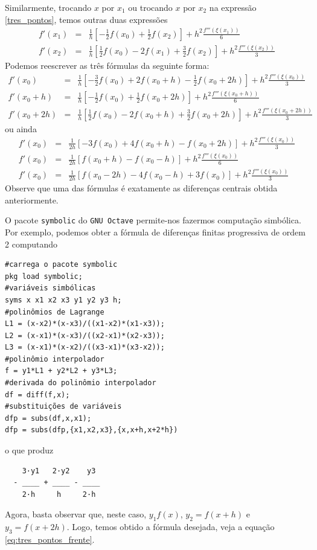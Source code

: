 Similarmente, trocando $x$ por $x_1$ ou trocando $x$ por $x_2$ na expressão \eqref{tres_pontos}, temos outras duas expressões
\begin{eqnarray*}
f'(x_1)&=&\frac{1}{h}\left[-\frac{1}{2}f(x_0)
+\frac{1}{2}f(x_{2})\right]+h^2\frac{f'''(\xi(x_1))}{6}\\
f'(x_2)&=&\frac{1}{h}\left[\frac{1}{2}f(x_0)-2f(x_{1})
+\frac{3}{2}f(x_{2})\right]+h^2\frac{f'''(\xi(x_2))}{3}
\end{eqnarray*}
Podemos reescrever as três fórmulas da seguinte forma:
\begin{eqnarray*}
f'(x_0)&=&\frac{1}{h}\left[-\frac{3}{2}f(x_0)+2f(x_{0}+h)
-\frac{1}{2}f(x_{0}+2h)\right]+h^2\frac{f'''(\xi(x_0))}{3}\\
f'(x_0+h)&=&\frac{1}{h}\left[-\frac{1}{2}f(x_0)
+\frac{1}{2}f(x_{0}+2h)\right]+h^2\frac{f'''(\xi(x_0+h))}{6}\\
f'(x_0+2h)&=&\frac{1}{h}\left[\frac{1}{2}f(x_0)-2f(x_{0}+h)
+\frac{3}{2}f(x_{0}+2h)\right]+h^2\frac{f'''(\xi(x_{0}+2h))}{3}
\end{eqnarray*}
ou ainda
\begin{eqnarray}
f'(x_0)&=&\frac{1}{2h}\left[-3f(x_0)+4f(x_{0}+h)
-f(x_{0}+2h)\right]+h^2\frac{f'''(\xi(x_0))}{3}\label{eq:tres_pontos_frente}\\
f'(x_0)&=&\frac{1}{2h}\left[f(x_{0}+h)-f(x_0-h)\right]+h^2\frac{f'''(\xi(x_0))}{6}\label{eq:tres_pontos_central}\\
f'(x_0)&=&\frac{1}{2h}\left[f(x_0-2h)-4f(x_{0}-h)
+3f(x_{0})\right]+h^2\frac{f'''(\xi(x_{0}))}{3}\label{eq:tres_pontos_traz}
\end{eqnarray}
Observe que uma das fórmulas é exatamente as diferenças centrais obtida anteriormente.

\ifisoctave
\begin{obs}
O pacote \verb+symbolic+ do \verb+GNU Octave+ permite-nos fazermos computação simbólica. Por exemplo, podemos obter a fórmula de diferenças finitas progressiva de ordem 2 computando
\begin{verbatim}
#carrega o pacote symbolic
pkg load symbolic;
#variáveis simbólicas
syms x x1 x2 x3 y1 y2 y3 h;
#polinômios de Lagrange
L1 = (x-x2)*(x-x3)/((x1-x2)*(x1-x3));
L2 = (x-x1)*(x-x3)/((x2-x1)*(x2-x3));
L3 = (x-x1)*(x-x2)/((x3-x1)*(x3-x2));
#polinômio interpolador
f = y1*L1 + y2*L2 + y3*L3;
#derivada do polinômio interpolador
df = diff(f,x);
#substituições de variáveis
dfp = subs(df,x,x1);
dfp = subs(dfp,{x1,x2,x3},{x,x+h,x+2*h})
\end{verbatim}
o que produz
\begin{verbatim}
    3·y1   2·y2    y3
  - ____ + ____ - ____
    2·h     h     2·h
\end{verbatim}
Agora, basta observar que, neste caso, $y_1 f(x)$, $y_2 = f(x+h)$ e $y_3 = f(x+2h)$. Logo, temos obtido a fórmula desejada, veja a equação \eqref{eq:tres_pontos_frente}.
\end{obs}
\fi

